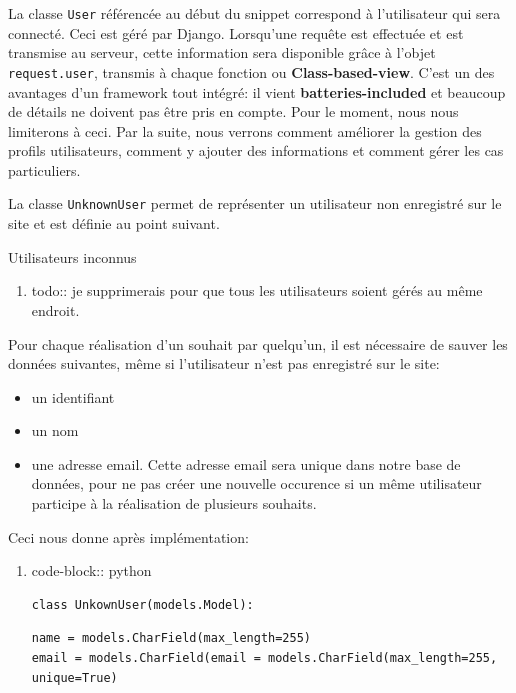 \documentclass[11pt]{amsbook}
\newenvironment{sidebar}[1][r]
  {\wrapfigure{#1}{0.5\textwidth}\tcolorbox}
  {\endtcolorbox\endwrapfigure}
\begin{document}
La classe \texttt{User} référencée au début du snippet correspond à l’utilisateur qui sera connecté. Ceci est géré par Django. Lorsqu’une requête est effectuée et est transmise au serveur, cette information sera disponible grâce à l’objet \texttt{request.user}, transmis à chaque fonction ou \textbf{Class-based-view}. C’est un des avantages d’un framework tout intégré: il vient \textbf{batteries-included} et beaucoup de détails ne doivent pas être pris en compte. Pour le moment, nous nous limiterons à ceci. Par la suite, nous verrons comment améliorer la gestion des profils utilisateurs, comment y ajouter des informations et comment gérer les cas particuliers.


La classe \texttt{UnknownUser} permet de représenter un utilisateur non enregistré sur le site et est définie au point suivant.


\begin{sidebar}
Utilisateurs inconnus
\end{sidebar}

\begin{enumerate}

\item{todo:: je supprimerais pour que tous les utilisateurs soient gérés au même endroit.}

\end{enumerate}


Pour chaque réalisation d’un souhait par quelqu’un, il est nécessaire de sauver les données suivantes, même si l’utilisateur n’est pas enregistré sur le site:


\begin{itemize}

\item un identifiant

\item un nom

\item une adresse email. Cette adresse email sera unique dans notre base de données, pour ne pas créer une nouvelle occurence si un même utilisateur participe à la réalisation de plusieurs souhaits.

\end{itemize}


Ceci nous donne après implémentation:


\begin{enumerate}

\item{code-block:: python}

\begin{verbatim}
class UnkownUser(models.Model):
\end{verbatim}

\begin{verbatim}
name = models.CharField(max_length=255)
email = models.CharField(email = models.CharField(max_length=255, unique=True)
\end{verbatim}
\end{enumerate}
\end{document}
